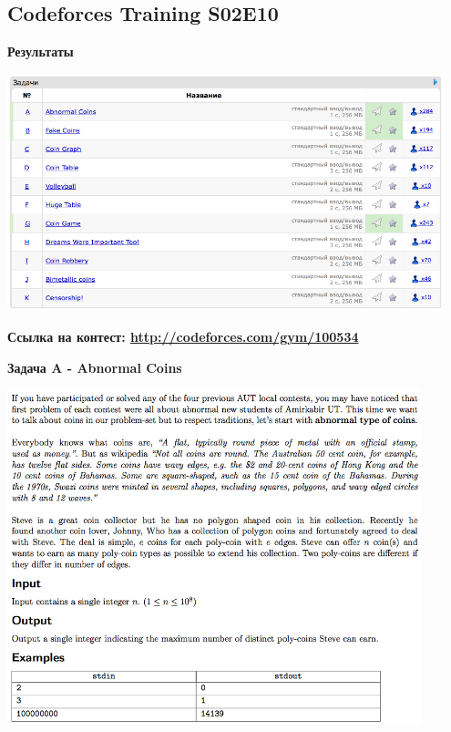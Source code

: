 \documentclass[a4paper,12pt]{article}
\begin{document}
%
%
\newpage
\subsection{Codeforces Training S02E10}

\textbf{{\large Результаты}} \\
\begin{center}
\includegraphics[width=0.95\textwidth]{CT_S02E10/CT_S02E10_result.png}\\ [1cm]
\end{center}

\textbf{{\large Ссылка на контест: \url{http://codeforces.com/gym/100534}}}

\newpage
\textbf{{\large Задача A - Abnormal Coins}}

\begin{center}
\includegraphics[width=0.9\textwidth]{CT_S02E10/CT_S02E10_A.png}\\ [1cm]
\end{center}
\end{document}
